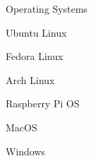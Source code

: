 \begin{skillset}{Operating Systems}
  \item Ubuntu Linux
  \item Fedora Linux
  \item Arch Linux
  \item Raspberry Pi OS
  \item MacOS
  \item Windows
\end{skillset}
